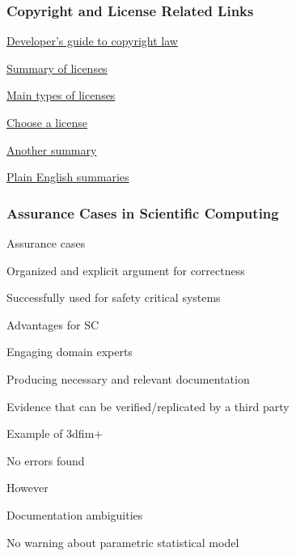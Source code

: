 \documentclass[t,12pt,numbers,fleqn]{beamer}
\begin{document}
\begin{frame}
\frametitle{Copyright and License Related Links}

\bi
\item
  \href{http://haacked.com/archive/2006/01/24/TheDevelopersGuideToCopyrightLaw-Part1.aspx/}{Developer's
    guide to copyright law}

\item \href{https://www.smashingmagazine.com/2010/03/a-short-guide-to-open-source-and-similar-licenses/}{Summary of licenses}

\item
  \href{http://haacked.com/archive/2007/04/04/there-are-only-four-software-licenses.aspx/}{Main
    types of licenses}

\item \href{http://choosealicense.com}{Choose a license}
\item \href{http://choosealicense.com/licenses/}{Another summary}
\item \href{https://tldrlegal.com}{Plain English summaries}

\ei

\end{frame}


\begin{frame}
\frametitle{Assurance Cases in Scientific Computing \cite{SmithEtAl2017}}

\bi
\item Assurance cases
\bi 
\item Organized and explicit argument for correctness
\item Successfully used for safety critical systems
\ei
\item Advantages for SC
\bi
\item Engaging domain experts
\item Producing necessary and relevant documentation
\item Evidence that can be verified/replicated by a third party
\ei
\item Example of 3dfim+
\bi
\item No errors found
\item However
\bi
\item Documentation ambiguities
\item No warning about parametric statistical model
\ei
\ei
\ei

\end{frame}
\end{document}
